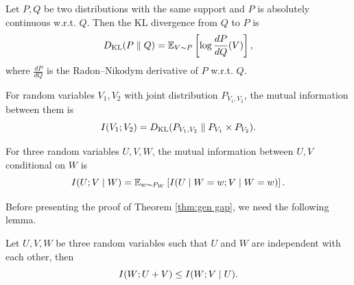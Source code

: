 \begin{definition}[KL-Divergence]
	Let $P, Q$ be two distributions with the same support and $P$ is absolutely continuous w.r.t. $Q$. Then the KL divergence from $Q$ to $P$ is 
	\begin{equation}
		\small
		D_{\mathrm{KL}}(P\parallel Q) = \mE_{V\sim P}\left[\log{\frac{dP}{dQ}(V)}\right],
	\end{equation}
	where $\frac{dP}{dQ}$ is the Radon–Nikodym derivative of $P$ w.r.t. $Q$. 
\end{definition}
\begin{definition}
	For random variables $V_{1}, V_{2}$ with joint distribution $P_{V_{1}, V_{2}}$, the mutual information between them is 
	\begin{equation}
		\small
		I(V_{1}; V_{2}) = D_{\mathrm{KL}}(P_{V_{1}, V_{2}}\parallel P_{V_{1}} \times P_{V_{2}}).
	\end{equation} 
\end{definition} 
\begin{definition}
	For three random variables $U, V, W$, the mutual information between $U, V$ conditional on $W$ is 
	\begin{equation}
		\small
		I(U; V\mid W) = \mE_{w\sim P_{W}}\left[I(U\mid W = w; V\mid W = w)\right]. 
	\end{equation}
\end{definition}
Before presenting the proof of Theorem \ref{thm:gen gap}, we need the following lemma.
\begin{lemma}\label{lem:chain rule}
	Let $U, V, W$ be three random variables such that $U$ and $W$ are independent with each other, then 
	\begin{equation}
		\small
		I(W; U + V) \leq I(W; V\mid U). 	
	\end{equation}
\end{lemma}
